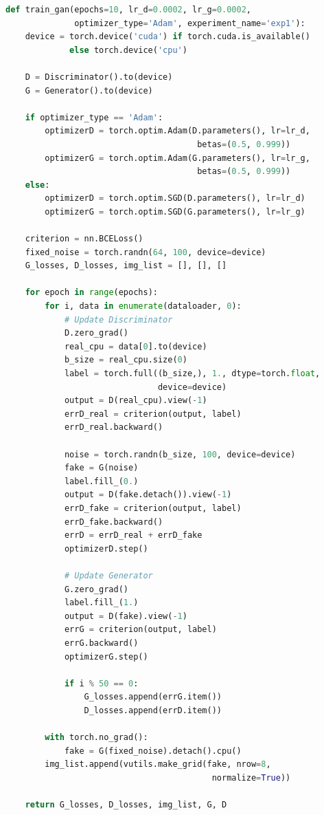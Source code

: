 \documentclass[a4paper]{article}
\begin{document}
\begin{lstlisting}[language=Python, caption=GAN训练函数]
def train_gan(epochs=10, lr_d=0.0002, lr_g=0.0002,
              optimizer_type='Adam', experiment_name='exp1'):
    device = torch.device('cuda') if torch.cuda.is_available()
             else torch.device('cpu')

    D = Discriminator().to(device)
    G = Generator().to(device)

    if optimizer_type == 'Adam':
        optimizerD = torch.optim.Adam(D.parameters(), lr=lr_d,
                                       betas=(0.5, 0.999))
        optimizerG = torch.optim.Adam(G.parameters(), lr=lr_g,
                                       betas=(0.5, 0.999))
    else:
        optimizerD = torch.optim.SGD(D.parameters(), lr=lr_d)
        optimizerG = torch.optim.SGD(G.parameters(), lr=lr_g)

    criterion = nn.BCELoss()
    fixed_noise = torch.randn(64, 100, device=device)
    G_losses, D_losses, img_list = [], [], []

    for epoch in range(epochs):
        for i, data in enumerate(dataloader, 0):
            # Update Discriminator
            D.zero_grad()
            real_cpu = data[0].to(device)
            b_size = real_cpu.size(0)
            label = torch.full((b_size,), 1., dtype=torch.float,
                               device=device)
            output = D(real_cpu).view(-1)
            errD_real = criterion(output, label)
            errD_real.backward()

            noise = torch.randn(b_size, 100, device=device)
            fake = G(noise)
            label.fill_(0.)
            output = D(fake.detach()).view(-1)
            errD_fake = criterion(output, label)
            errD_fake.backward()
            errD = errD_real + errD_fake
            optimizerD.step()

            # Update Generator
            G.zero_grad()
            label.fill_(1.)
            output = D(fake).view(-1)
            errG = criterion(output, label)
            errG.backward()
            optimizerG.step()

            if i % 50 == 0:
                G_losses.append(errG.item())
                D_losses.append(errD.item())

        with torch.no_grad():
            fake = G(fixed_noise).detach().cpu()
        img_list.append(vutils.make_grid(fake, nrow=8,
                                          normalize=True))

    return G_losses, D_losses, img_list, G, D
\end{lstlisting}
\end{document}
